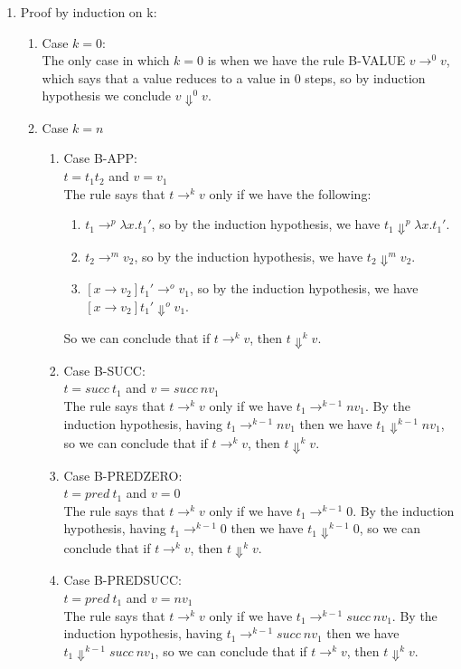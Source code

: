 \documentclass[a4paper]{article}
\begin{document}
\begin{enumerate}
\item Proof by induction on k:
\begin{enumerate}
\item Case $k = 0$:
\\The only case in which $k = 0$ is when we have the rule B-VALUE $v \rightarrow^0 v$, which says that a value reduces to a value in 0 steps, so by induction hypothesis we conclude $v \Downarrow^0 v$.
\item Case $k = n$
\begin{enumerate}
\item Case B-APP:
\\$t = t_1 t_2$ and $v = v_1$
\\The rule says that $t \rightarrow^k v$ only if we have the following:
\begin{enumerate}
\item $t_1 \rightarrow^p \lambda x.t_1'$, so by the induction hypothesis, we have $t_1 \Downarrow^p \lambda x.t_1'$.
\item $t_2 \rightarrow^m v_2$, so by the induction hypothesis, we have $t_2 \Downarrow^m v_2$.
\item $[x \rightarrow v_2]t_1' \rightarrow^o v_1$, so by the induction hypothesis, we have $[x \rightarrow v_2]t_1' \Downarrow^o v_1$.
\end{enumerate}
So we can conclude that if $t \rightarrow^k v$, then $t \Downarrow^k v$.
\item Case B-SUCC:
\\$t = succ \ t_1$ and $v = succ \ nv_1$
\\The rule says that $t \rightarrow^k v$ only if we have $t_1 \rightarrow^{k-1} nv_1$. By the induction hypothesis, having $t_1 \rightarrow^{k-1} nv_1$ then we have $t_1 \Downarrow^{k-1} nv_1$, so we can conclude that if $t \rightarrow^k v$, then $t \Downarrow^k v$.
\item Case B-PREDZERO:
\\$t = pred \ t_1$ and $v = 0$
\\The rule says that $t \rightarrow^k v$ only if we have $t_1 \rightarrow^{k-1} 0$. By the induction hypothesis, having $t_1 \rightarrow^{k-1} 0$ then we have $t_1 \Downarrow^{k-1} 0$, so we can conclude that if $t \rightarrow^k v$, then $t \Downarrow^k v$.
\item Case B-PREDSUCC:
\\$t = pred \ t_1$ and $v = nv_1$
\\The rule says that $t \rightarrow^k v$ only if we have $t_1 \rightarrow^{k-1} succ \ nv_1$. By the induction hypothesis, having $t_1 \rightarrow^{k-1} succ \ nv_1$ then we have $t_1 \Downarrow^{k-1} succ \ nv_1$, so we can conclude that if $t \rightarrow^k v$, then $t \Downarrow^k v$.
\end{enumerate}
\end{enumerate}
\end{enumerate}
\end{document}
